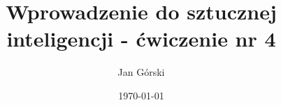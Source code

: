 


  \title{Wprowadzenie do sztucznej inteligencji - ćwiczenie nr 4}
  \author{Jan Górski}
  \date{\today}

  

  \maketitle

  \begin{sloppypar}

    \newpage

    \tableofcontents

    \newpage
    
    \newpage
    
    \newpage
    
    \newpage
    

%    
	\newpage

  \end{sloppypar}

